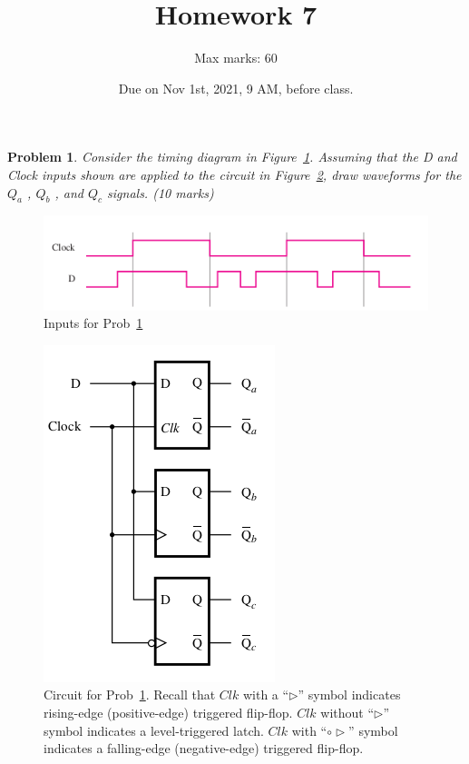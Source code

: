 \documentclass[twocolumn]{article}
\title{Homework 7}
\author{Max marks: 60}
\date{Due on Nov 1st, 2021, 9 AM, before class.}
\newtheorem{prob}{Problem}
\begin{document}
\maketitle
\begin{prob}
  Consider the timing diagram in Figure~\ref{fig:p51}. Assuming that the D and Clock inputs shown
  are applied to the circuit in Figure~\ref{fig:5.10}, draw waveforms for the
  $Q_a$ , $Q_b$ , and $Q_c$ signals. (10 marks)~\cite[Prob 5.1]{brown2013fundamentals}
  \label{prob:1}
\end{prob}
\begin{figure}[h]
  \includegraphics[width=\linewidth]{fig-p5.1.png}
  \caption{Inputs for Prob~\ref{prob:1}}
  \label{fig:p51}
\end{figure}
\begin{figure}[ht!]
  \includegraphics[width=0.7\linewidth]{fig-5.10.png}
  \caption{Circuit for Prob~\ref{prob:1}.
    Recall that $Clk$ with a ``$\triangleright$'' symbol
    indicates rising-edge (positive-edge) triggered flip-flop. $Clk$ without
    ``$\triangleright$'' symbol indicates a level-triggered latch.
    $Clk$ with ``$\circ\triangleright$'' symbol
    indicates a falling-edge (negative-edge) triggered flip-flop. 
  }
  \label{fig:5.10}
\end{figure}
\end{document}
